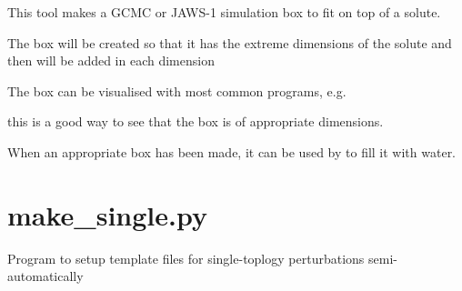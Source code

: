 \documentclass[letterpaper,10pt,english]{sphinxmanual}
\begin{document}

This tool makes a GCMC or JAWS-1 simulation box to fit on top of a solute.

The box will be created so that it has the extreme dimensions of the solute and then  will be added in each dimension

The box can be visualised with most common programs, e.g.

%
\begin{sphinxVerbatim}[commandchars=\\\{\}]
   
\end{sphinxVerbatim}

this is a good way to see that the box is of appropriate dimensions.

When an appropriate box has been made, it can be used by  to fill it with water.


\section{make\_single.py}
\label{\detokenize{tools:make-single-py}}

Program to setup template files for single-toplogy perturbations semi-automatically


%
\begin{sphinxVerbatim}[commandchars=\\\{\}]
  \PYG{p}{[}\PYG{p}{]} \PYG{p}{[} \PYG{p}{]} \PYG{p}{[} \PYG{p}{]} \PYG{p}{[} \PYG{p}{]} \PYG{p}{[} \PYG{p}{]}
                      \PYG{p}{[} \PYG{p}{]} \PYG{p}{[} \PYG{p}{]} \PYG{p}{[} \PYG{p}{]}
\end{sphinxVerbatim}
\end{document}
